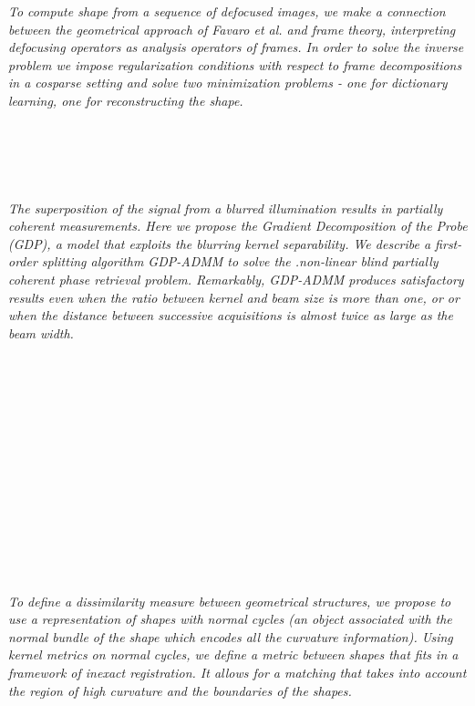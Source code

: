   \begin{multicols}{2}
      \textit{To compute shape from a sequence of defocused images, we make a connection between the geometrical approach of Favaro et al.  and frame theory, interpreting  defocusing operators as analysis operators of  frames.  In order to solve the inverse problem we impose regularization conditions with respect to frame decompositions in a cosparse setting and solve two minimization problems - one for dictionary learning, one for reconstructing the shape.}\\
\\ 
        \\
        \\\\
\\
      \textit{The superposition of the  signal from a blurred illumination results in partially coherent measurements. Here we propose the Gradient Decomposition of the Probe (GDP), a model that exploits the blurring kernel separability. We describe a first-order splitting algorithm GDP-ADMM to solve the .non-linear blind partially coherent phase retrieval problem. Remarkably, GDP-ADMM produces satisfactory results even when the ratio between kernel and beam size is more than one, or or when the distance between successive acquisitions is almost twice as large as the beam width.}\\
\\ 
        \\
        \\\\
        \\
        \\\\
        \\
        \\\\
        \\
        \\\\
\\
      \textit{To define a dissimilarity measure between geometrical structures, we propose to use a representation of shapes with normal cycles (an object associated with the normal bundle of the shape which encodes all the curvature information). Using kernel metrics on normal cycles, we define a metric between shapes that fits in a framework of inexact registration. It allows for a matching that takes into account the region of high curvature and the boundaries of the shapes.}\\

\end{multicols}
